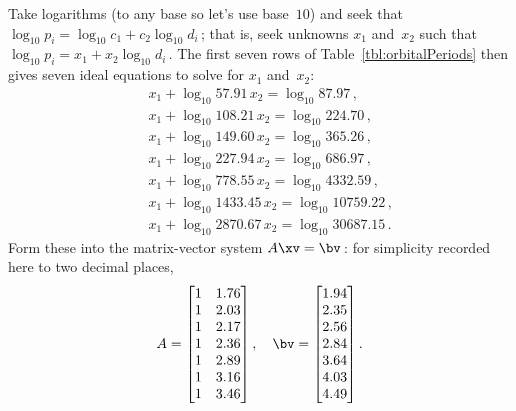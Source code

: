 \begin{example}
\begin{solution}
Take logarithms (to any base so let's use base~\(10\)) and seek that 
\(\log_{10}p_i=\log_{10} c_1+c_2\log_{10}d_i\)\,; that is, seek unknowns \(x_1\) and~\(x_2\) such that \(\log_{10}p_i=x_1+x_2\log_{10}d_i\)\,.
The first seven rows of Table~\ref{tbl:orbitalPeriods} then gives seven ideal equations to solve for \(x_1\) and~\(x_2\):
\begin{eqnarray*}
&&x_1+\log_{10}57.91\,x_2=\log_{10}87.97\,, %
\\&&x_1+\log_{10}108.21\,x_2=\log_{10}224.70\,, %
\\&&x_1+\log_{10}149.60\,x_2=\log_{10}365.26\,, %
\\&&x_1+\log_{10}227.94\,x_2=\log_{10}686.97\,, %
\\&&x_1+\log_{10}778.55\,x_2=\log_{10}4332.59\,, %
\\&&x_1+\log_{10}1433.45\,x_2=\log_{10}10759.22\,, %
\\&&x_1+\log_{10}2870.67\,x_2=\log_{10}30687.15\,. %
\end{eqnarray*}
Form these into the matrix-vector system \(A\xv=\bv\)\,:
for simplicity recorded here to two decimal places,
\begin{equation*}
A= \begin{bmatrix}   1&1.76\\
   1&2.03\\
   1&2.17\\
   1&2.36\\
   1&2.89\\
   1&3.16\\
   1&3.46
 \end{bmatrix},
\quad \bv=\begin{bmatrix}   1.94\\
   2.35\\
   2.56\\
   2.84\\
   3.64\\
   4.03\\
   4.49
\end{bmatrix}.
\end{equation*}


\end{solution}
\end{example}
